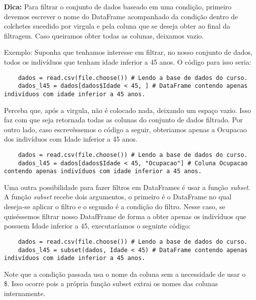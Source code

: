 \documentclass{article}
\begin{document}
\textbf{Dica: } Para filtrar o conjunto de dados baseado em uma condição, primeiro devemos escrever o nome do DataFrame acompanhado da condição dentro de colchetes
 sucedido por virgula e pela coluna que se deseja obter ao final da filtragem. Caso queiramos obter todas as colunas, deixamos vazio. 

Exemplo: Suponha que tenhamos interesse em filtrar, no nosso conjunto de dados, todos os indivíduos que tenham idade inferior a 45 anos. O código para isso seria:

\begin{verbatim}
    dados = read.csv(file.choose()) # Lendo a base de dados do curso.
    dados_l45 = dados[dados$Idade < 45, ] # DataFrame contendo apenas indivíduos com idade inferior a 45 anos.
\end{verbatim}

Perceba que, após a virgula, não é colocado nada, deixando um espaço vazio. Isso faz com que seja retornada todas as colunas do conjunto de dados filtrado. 
Por outro lado, caso escrevêssemos o código a seguir, obteriamos apenas a Ocupacao dos indivíduos com Idade inferior a 45 anos. 

\begin{verbatim}
    dados = read.csv(file.choose()) # Lendo a base de dados do curso.
    dados_l45 = dados[dados$Idade < 45, "Ocupacao"] # Coluna Ocupacao contendo apenas indivíduos com idade inferior a 45 anos.
\end{verbatim}

Uma outra possibilidade para fazer filtros em DataFrames é usar a função \textit{subset}. A função \textit{subset} recebe dois argumentos, o primeiro é o DataFrame no qual
deseja-se aplicar o filtro e o segundo é a condição do filtro. Nesse caso, se quiséssemos filtrar nosso DatafFrame de forma a obter apenas os indivíduos que possuem 
Idade inferior a 45, executaríamos o seguinte código:

\begin{verbatim}
    dados = read.csv(file.choose()) # Lendo a base de dados do curso.
    dados_l45 = subset(dados, Idade < 45) # DataFrame contendo apenas indivíduos com idade inferior a 45 anos.
\end{verbatim}

Note que a condição passada usa o nome da coluna sem a necessidade de usar o \$. Isso ocorre pois a própria função subset extrai os nomes das colunas internamente. 
\end{document}
